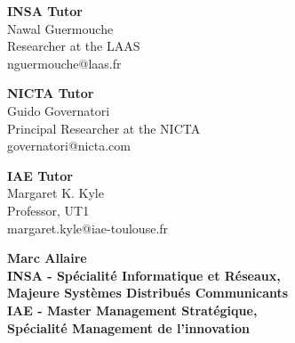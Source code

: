 \documentclass[10pt]{report}
\begin{document}
\begin{titlepage}
\vspace{1.3cm}
\begin{center}
\begin{minipage}{.3\textwidth}
\begin{center}
\textbf{INSA Tutor}\\
Nawal Guermouche\\
Researcher at the LAAS\\
nguermouche@laas.fr
\end{center}
\end{minipage}
\begin{minipage}{.3\textwidth}
\begin{center}
\textbf{NICTA Tutor}\\
Guido Governatori\\
Principal Researcher at the NICTA\\
governatori@nicta.com
\end{center}
\end{minipage}
\begin{minipage}{.3\textwidth}
\begin{center}
\textbf{IAE Tutor}\\
Margaret K. Kyle\\
Professor, UT1\\
margaret.kyle@iae-toulouse.fr
\end{center}
\end{minipage}
\end{center}

\vfill
\begin{minipage}{0.55\textwidth}
\begin{flushleft}
\textbf{\large Marc Allaire\\[.5cm] 
\small INSA - Spécialité Informatique et Réseaux,\\\hspace{.5cm}Majeure Systèmes Distribués Communicants\\
IAE - Master Management Stratégique,\\\hspace{.5cm}Spécialité Management de l'innovation}
\end{flushleft}
\end{minipage}
\begin{minipage}{0.4\textwidth}
\begin{flushright}
\textbf{}
\end{flushright}
\end{minipage}


\end{titlepage}
\end{document}
